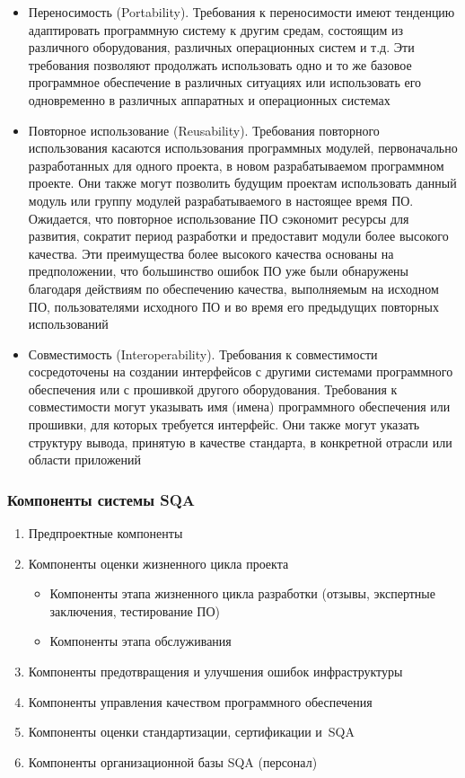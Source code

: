 \documentclass{../industrial-development}
\begin{document}
\lecturenotes

 	 \begin{itemize}
\item Переносимость (Portability). Требования к переносимости имеют тенденцию адаптировать программную систему к другим средам, состоящим из различного оборудования, различных операционных систем и т.д. Эти требования позволяют продолжать использовать одно и то же базовое программное обеспечение в различных ситуациях или использовать его одновременно в различных аппаратных и операционных системах
\item Повторное использование (Reusability). Требования повторного использования касаются использования программных модулей, первоначально разработанных для одного проекта, в новом разрабатываемом программном проекте. Они также могут позволить будущим проектам использовать данный модуль или группу модулей разрабатываемого в настоящее время ПО. Ожидается, что повторное использование ПО сэкономит ресурсы для развития, сократит период разработки и предоставит модули более высокого качества. Эти преимущества более высокого качества основаны на предположении, что большинство ошибок ПО уже были обнаружены благодаря действиям по обеспечению качества, выполняемым на исходном ПО, пользователями исходного ПО и во время его предыдущих повторных использований
\item Совместимость (Interoperability). Требования к совместимости сосредоточены на создании интерфейсов с другими системами программного обеспечения или с прошивкой другого оборудования. Требования к совместимости могут указывать имя (имена) программного обеспечения или прошивки, для которых требуется интерфейс. Они также могут указать структуру вывода, принятую в качестве стандарта, в конкретной отрасли или области приложений~\cite[с.~43--44]{SQA-Galin}
  	\end{itemize}



\begin{frame} \frametitle{Компоненты системы SQA}
 	 \begin{enumerate}
\item Предпроектные компоненты
\item Компоненты оценки жизненного цикла проекта
 		 \begin{itemize}
	\item Компоненты этапа жизненного цикла разработки (отзывы, экспертные заключения, тестирование ПО)
	\item Компоненты этапа обслуживания
  		\end{itemize}
\item Компоненты предотвращения и улучшения ошибок инфраструктуры
\item Компоненты управления качеством программного обеспечения
\item Компоненты оценки стандартизации, сертификации и~SQA
\item Компоненты организационной базы SQA (персонал)
  	\end{enumerate}
\end{frame}
\end{document}
